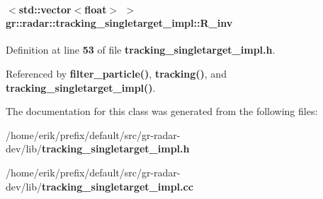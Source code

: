\paragraph[{R\+\_\+inv}]{$<${\bf std\+::vector}$<$float$>$ $>$ gr\+::radar\+::tracking\+\_\+singletarget\+\_\+impl\+::\+R\+\_\+inv}\label{classgr_1_1radar_1_1tracking__singletarget__impl_ab45a6160fd34d0ba05aaba8f4adfb6f0}


Definition at line {\bf 53} of file {\bf tracking\+\_\+singletarget\+\_\+impl.\+h}.



Referenced by {\bf filter\+\_\+particle()}, {\bf tracking()}, and {\bf tracking\+\_\+singletarget\+\_\+impl()}.



The documentation for this class was generated from the following files\+:\begin{DoxyCompactItemize}
\item 
/home/erik/prefix/default/src/gr-\/radar-\/dev/lib/{\bf tracking\+\_\+singletarget\+\_\+impl.\+h}\item 
/home/erik/prefix/default/src/gr-\/radar-\/dev/lib/{\bf tracking\+\_\+singletarget\+\_\+impl.\+cc}\end{DoxyCompactItemize}
